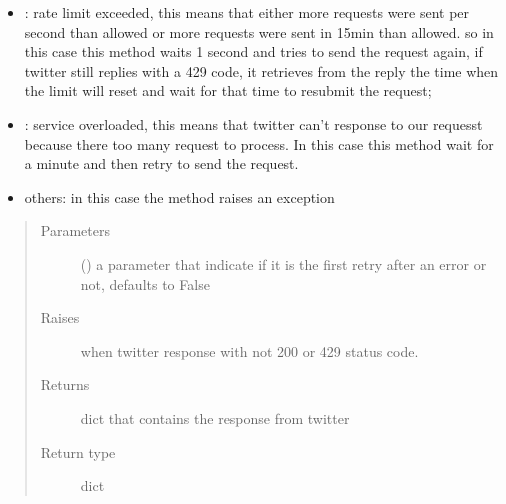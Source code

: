 \documentclass[letterpaper,10pt,english]{sphinxmanual}
\begin{document}
\begin{fulllineitems}
\begin{fulllineitems}
\begin{itemize}
\item {} 
: rate limit exceeded, this means that either more requests were sent per second than allowed or more requests were sent in 15min than allowed. so in this case this method waits 1 second and tries to send the request again,  if twitter still replies with a 429 code, it retrieves from the reply the time when the limit will reset and wait for that time to resubmit the request;

\item {} 
: service overloaded, this means that twitter can’t response to our requesst because there too many request to process. In this case this method wait for a minute and then retry to send the request.

\item {} 
\sphinxAtStartPar
others: in this case the method raises an exception

\end{itemize}
\begin{quote}\begin{description}
\item[{Parameters}] \leavevmode
\sphinxAtStartPar
{} (\sphinxstyleliteralemphasis{\sphinxupquote{, }}) \textendash{} a parameter that indicate if it is the first retry after an error or not, defaults to False

\item[{Raises}] \leavevmode
\sphinxAtStartPar
{} \textendash{} when twitter response with not 200 or 429 status code.

\item[{Returns}] \leavevmode
\sphinxAtStartPar
dict that contains the response from twitter

\item[{Return type}] \leavevmode
\sphinxAtStartPar
dict

\end{description}\end{quote}

\end{fulllineitems}



\end{fulllineitems}
\end{document}
